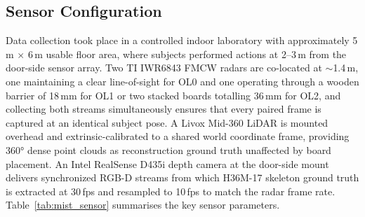 \documentclass{article}
\begin{document}
\subsection{Sensor Configuration}
\label{app:mist_sensor}

Data collection took place in a controlled indoor laboratory with approximately
5\,m $\times$ 6\,m usable floor area, where subjects performed actions at 2--3\,m
from the door-side sensor array.
Two TI IWR6843 FMCW radars are co-located at $\sim$1.4\,m, one
maintaining a clear line-of-sight for OL0 and one operating through a wooden
barrier of 18\,mm for OL1 or two stacked boards totalling 36\,mm for OL2,
and collecting both streams simultaneously ensures that every paired frame is
captured at an identical subject pose.
A Livox Mid-360 LiDAR is mounted overhead and extrinsic-calibrated to a shared
world coordinate frame, providing 360° dense point clouds as reconstruction
ground truth unaffected by board placement.
An Intel RealSense D435i depth camera at the door-side mount delivers
synchronized RGB-D streams from which H36M-17 skeleton ground truth is
extracted at 30\,fps and resampled to 10\,fps to match the radar frame rate.
Table~\ref{tab:mist_sensor} summarises the key sensor parameters.
\end{document}
